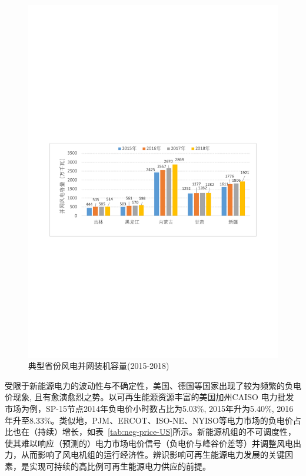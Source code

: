\begin{figure}[H] %
  \centering
  \includegraphics[scale=0.75]{figures/Chap1-1-Wind-Installment-Capacity.pdf}
  \caption{典型省份风电并网装机容量(2015-2018)}
  \label{fig:Wind-Installment-Capacity}
\end{figure}

受限于新能源电力的波动性与不确定性，美国、德国等国家出现了较为频繁的负电价现象, 且有愈演愈烈之势\cite{Neg-Price-US-Evidence,Neg-Price-German-13}。以可再生能源资源丰富的美国加州CAISO 电力批发市场为例，SP-15节点2014年负电价小时数占比为5.03\%, 2015年升为5.40\%, 2016 年升至8.33\%\cite{Neg-Price-US-Evidence}。类似地，PJM、ERCOT、ISO-NE、NYISO等电力市场的负电价占比也在（持续）增长，如表~\ref{tab:neg-price-US}所示。新能源机组的不可调度性，使其难以响应（预测的）电力市场电价信号（负电价与峰谷价差等）并调整风电出力，从而影响了风电机组的运行经济性。辨识影响可再生能源电力发展的关键因素，是实现可持续的高比例可再生能源电力供应的前提。


